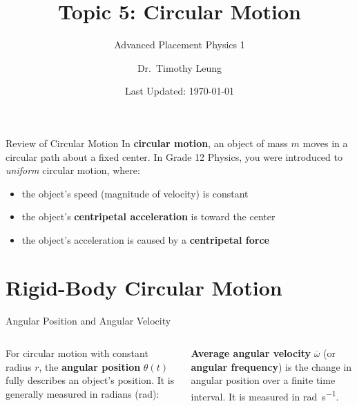 \documentclass[12pt,compress,aspectratio=169]{beamer}
\title{Topic 5: Circular Motion}
\subtitle{Advanced Placement Physics 1}
\author[TML]{Dr.\ Timothy Leung}
\institute{Olympiads School}
\date{Last Updated: \today}
\newcommand{\eq}[2]{\vspace{#1}{\Large\begin{displaymath}#2\end{displaymath}}}
\begin{document}
\begin{frame}
  \maketitle
\end{frame}


\begin{frame}{Review of Circular Motion}
  In \textbf{circular motion}, an object of mass $m$ moves in a circular path
  about a fixed center. In Grade 12 Physics, you were introduced to
  \emph{uniform} circular motion, where:
  \begin{itemize}
  \item the object's speed (magnitude of velocity) is constant
  \item the object's \textbf{centripetal acceleration} is toward the center
  \item the object's acceleration is caused by a \textbf{centripetal force}
  \end{itemize}
\end{frame}



\section{Rigid-Body Circular Motion}

\begin{frame}{Angular Position and Angular Velocity}
  \vspace{.2in}
  \begin{columns}
    
    For circular motion with constant radius $r$, the \textbf{angular position}
    $\theta(t)$ fully describes an object's position. It is generally measured
    in radians (rad):
      
    \eq{-.25in}{
      \boxed{\theta=\theta(t)}
    }
    
    \textbf{Average angular velocity} $\overline\omega$ (or
    \textbf{angular frequency}) is the change in angular position over a finite
    time interval. It is measured in \si{rad\per\second}.
    
    \eq{-.2in}{
      \boxed{\overline\omega=\frac{\Delta\theta}{\Delta t}}
    }

  \end{columns}
\end{frame}
\end{document}
